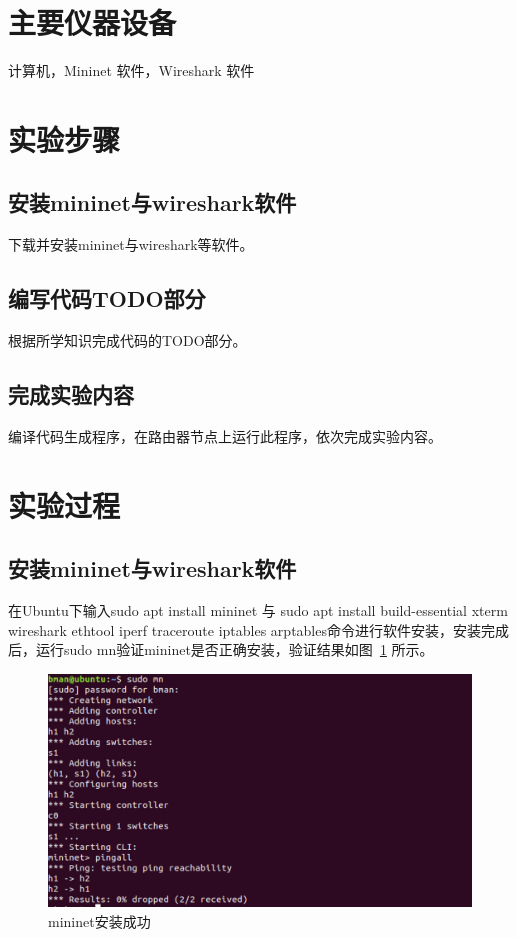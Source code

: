 \documentclass{zjureport}
\begin{document}
\section{主要仪器设备}
  计算机，Mininet 软件，Wireshark 软件

\section{实验步骤}
  \subsection{安装mininet与wireshark软件}
      下载并安装mininet与wireshark等软件。
  \subsection{编写代码TODO部分}
      根据所学知识完成代码的TODO部分。
  \subsection{完成实验内容}
      编译代码生成程序，在路由器节点上运行此程序，依次完成实验内容。

\section{实验过程}
  \subsection{安装mininet与wireshark软件}
     在Ubuntu下输入sudo apt install mininet 与 sudo apt install build-essential xterm wireshark ethtool iperf traceroute iptables arptables命令进行软件安装，安装完成后，运行sudo mn验证mininet是否正确安装，验证结果如图~\ref{fig:install} 所示。
           \begin{figure}[!htbp]
               \centering
               \includegraphics[width=0.7\linewidth]{figures/02.jpg}
               \caption{mininet安装成功}
               \label{fig:install}
           \end{figure}
\end{document}

